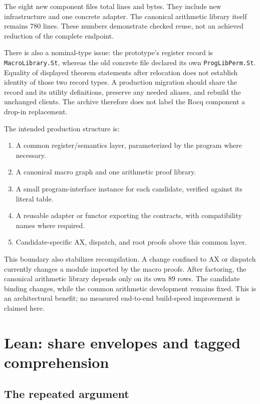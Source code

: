 \documentclass[11pt,letterpaper]{article}
\theoremstyle{definition}\newtheorem{definition}[theorem]{Definition}
\theoremstyle{remark}\newtheorem{remark}[theorem]{Remark}
\newcommand{\code}[1]{\texttt{\small #1}}
\begin{document}
The eight new component files total \RocqComponentLines{} lines and \RocqComponentBytes{} bytes. They include new infrastructure and one concrete adapter. The canonical arithmetic library itself remains 780 lines. These numbers demonstrate checked reuse, not an achieved reduction of the complete endpoint.

There is also a nominal-type issue: the prototype's register record is \code{MacroLibrary.St}, whereas the old concrete file declared its own \code{ProgLibPerm.St}. Equality of displayed theorem statements after relocation does not establish identity of those two record types. A production migration should share the record and its utility definitions, preserve any needed aliases, and rebuild the unchanged clients. The archive therefore does not label the Rocq component a drop-in replacement.

The intended production structure is:
\begin{enumerate}
\item A common register/semantics layer, parameterized by the program where necessary.
\item A canonical macro graph and one arithmetic proof library.
\item A small program-interface instance for each candidate, verified against its literal table.
\item A reusable adapter or functor exporting the contracts, with compatibility names where required.
\item Candidate-specific AX, dispatch, and root proofs above this common layer.
\end{enumerate}

This boundary also stabilizes recompilation. A change confined to AX or dispatch currently changes a module imported by the macro proofs. After factoring, the canonical arithmetic library depends only on its own 89 rows. The candidate binding changes, while the common arithmetic development remains fixed. This is an architectural benefit; no measured end-to-end build-speed improvement is claimed here.

\section{Lean: share envelopes and tagged comprehension}

\subsection{The repeated argument}
\end{document}
